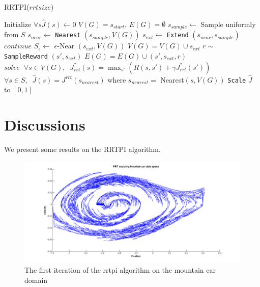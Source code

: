 \documentclass[wcp]{jmlr}
\begin{document}
\begin{algorithm2e}
\caption{RRTPI($rrtsize$)}
\label{alg:rrtpi}
\dontprintsemicolon
Initialize $ \forall s \hat{J}(s) \leftarrow 0$\;
{
	$V(G)=s_{start},\,E(G)=\emptyset$\;
	{
		$s_{sample} \leftarrow$ Sample uniformly from $S$\;
		$s_{near} \leftarrow $ \texttt{Nearest} $(s_{sample},V(G))$\;
		$s_{ext} \leftarrow$ \texttt{Extend} $(s_{near},s_{sample})$\;
		{
		$continue$\;
		}
		$S_{\epsilon} \leftarrow$ $\epsilon$-Near $(s_{ext},V(G))$\;
		$V(G) = V(G) \cup s_{ext}$\;
		{		
			$r\sim$ \texttt{SampleReward} $(s',s_{ext})$\;
			$E(G) = E(G) \cup (s',s_{ext},r)$\;
		}	
	}
$solve\;\;\forall s \in V(G),\;\; J_{rrt}^*(s) = \max_{s'}( R(s,s') + \gamma J_{rrt}^*(s'))$\;
$\forall s \in S,\;\; \hat{J}(s) = J^{rrt}(s_{nearest})$ where $s_{nearest} =$ Nearest$(s,V(G))$ \;
\texttt{Scale} $\hat{J}$ to $[0,1]$
}
\end{algorithm2e}

\section{Discussions}
 We present some results on the RRTPI algorithm.\\
\begin{figure}[htb]
\centering
\label{fig:val1}
\includegraphics[width=450px]{rggpi.png}
\caption{The first iteration of the rrtpi algorithm on the mountain car domain}
\end{figure}
\end{document}
